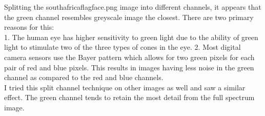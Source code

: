 Splitting the southafricaflagface.png image into different channels, it appears that the green channel resembles greyscale image the closest. There are two primary reasons for this:\\
1. The human eye has higher sensitivity to green light due to the ability of green light to stimulate two of the three types of cones in the eye.
2. Most digital camera sensors use the Bayer pattern which allows for two green pixels for each pair of red and blue pixels. This results in images having less noise in the green channel as compared to the red and blue channels.\\

I tried this split channel technique on other images as well and saw a similar effect. The green channel tends to retain the most detail from the full spectrum image.